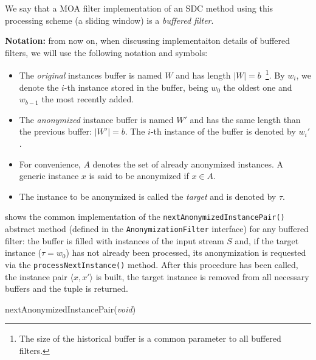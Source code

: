 We say that a MOA filter implementation of an SDC method using this processing scheme (a sliding window) is a \textit{buffered filter}.

\textbf{Notation:} from now on, when discussing implementaiton details of buffered filters, we will use the following notation and symbols:

\begin{itemize}
	\item
	The \textit{original} instances buffer is named $W$ and has length $\vert W \vert = b$~\footnote{The size of the historical buffer is a common parameter to all buffered filters.}. By $w_i$, we denote the $i$-th instance stored in the buffer, being $w_0$ the oldest one and $w_{b-1}$ the most recently added.
	\item
	The \textit{anonymized} instance buffer is named $W'$ and has the same length than the previous buffer: $\vert W' \vert = b$. The $i$-th instance of the buffer is denoted by $w_i'$.
	\item
	For convenience, $A$ denotes the set of already anonymized instances. A generic instance $x$ is said to be anonymized if $x \in A$.
	\item
	The instance to be anonymized is called the \textit{target} and is denoted by $\tau$.
\end{itemize}

 shows the common implementation of the \texttt{nextAnonymizedInstancePair()} abstract method (defined in the \texttt{AnonymizationFilter} interface) for any buffered filter: the buffer is filled with instances of the input stream $S$ and, if the target instance ($\tau = w_0$) has not already been processed, its anonymization is requested via the \texttt{processNextInstance()} method. After this procedure has been called, the instance pair $\langle x, x' \rangle$ is built, the target instance is removed from all necessary buffers and the tuple is returned.

\begin{procedure}[H]
\caption{nextAnonymizedInstancePair(\textit{void})\label{al:buffered-procedure}}
\end{procedure}

